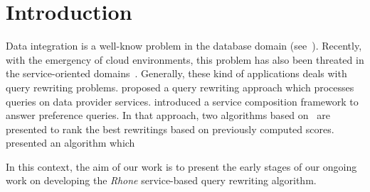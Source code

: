 \section{Introduction}
Data integration is a well-know problem in the database domain (see~\cite{Halevy:2001}). 
Recently, with the emergency of cloud environments, this problem has also been threated in the service-oriented domains~\cite{Barhamgi2010,Benouaret2011,ba2014}.
Generally, these kind of applications deals with query rewriting problems.
\cite{Barhamgi2010} proposed a query rewriting approach which processes queries on data provider services. \cite{Benouaret2011} introduced a service composition framework to answer preference queries. In that approach, two algorithms based on~\cite{Barhamgi2010} are presented to rank the best rewritings based on previously computed scores.
\cite{ba2014} presented an algorithm which 

In this context, the aim of our work is to present the early stages of our
ongoing work on developing the \textit{Rhone} service-based query rewriting
algorithm.

